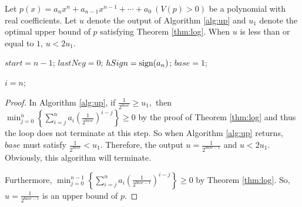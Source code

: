\begin{theorem}
	Let $p(x)=a_nx^n+a_{n-1}x^{n-1}+\cdots+a_0\ (V(p)> 0)$ be a polynomial with real coefficients. Let  $u$ denote the output of Algorithm \ref{alg:up} and $u_1$ denote the optimal upper bound of $p$ satisfying
	Theorem \ref{thm:log}. When $u$ is less than or equal to $1$, $u<2u_1$.
	
\end{theorem}


\begin{algorithm}[H]
\caption{\up \label{alg:up}}
\DontPrintSemicolon
{}
$start=n-1$;
$lastNeg=0$;
$hSign={\rm sign}(a_n)$;
$base=1$;\;



$i=n$;\;

\end{algorithm}

\begin{proof}
  In Algorithm \ref{alg:up}, if  $\frac{1}{2^{base}}\ge u_1,$ then $\min_{j=0}^{n}\left\{ \sum_{i=j}^na_i\left( {\frac{1}{2^{base}} }
  \right)^{i-j}\right \}\ge 0$ by the proof of Theorem \ref{thm:log} and thus %
  the loop does not terminate at this step.
  So when Algorithm \ref{alg:up} returns, $base$ must satisfy $\frac{1}{2^{base}}<u_1$. Therefore, the output $u=\frac{1}{2^{base-1}}$ and $u<2u_1$.
  Obviously, this algorithm will terminate.

  Furthermore,  $\min_{j=0}^{n-1}\left\{ \sum_{i=j}^na_i\left( {\frac{1}{2^{base-1}} } \right)^{i-j}\right \}\ge 0$ by Theorem \ref{thm:log}. So, $u=\frac{1}{2^{base-1}}$ is an upper bound of $p$.
\end{proof}


